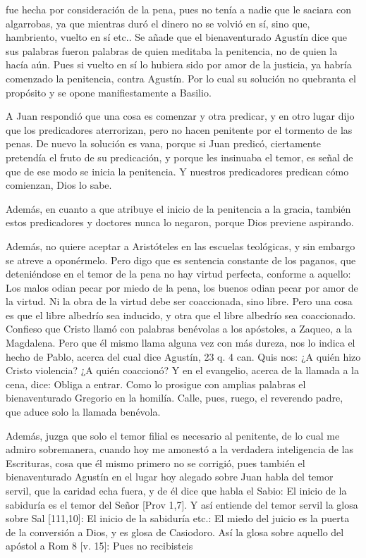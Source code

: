 fue hecha por consideración de la pena, pues no tenía a nadie que le saciara con algarrobas, ya que mientras duró el dinero no se volvió en sí, sino que, hambriento, vuelto en sí etc.. Se añade que el bienaventurado Agustín dice que sus palabras fueron palabras de quien meditaba la penitencia, no de quien la hacía aún. Pues si vuelto en sí lo hubiera sido por amor de la justicia, ya habría comenzado la penitencia, contra Agustín. Por lo cual su solución no quebranta el propósito y se opone manifiestamente a Basilio.

A Juan respondió que una cosa es comenzar y otra predicar, y en otro lugar dijo que los predicadores aterrorizan, pero no hacen penitente por el tormento de las penas. De nuevo la solución es vana, porque si Juan predicó, ciertamente pretendía el fruto de su predicación, y porque les insinuaba el temor, es señal de que de ese modo se inicia la penitencia. Y nuestros predicadores predican cómo comienzan, Dios lo sabe.

Además, en cuanto a que atribuye el inicio de la penitencia a la gracia, también estos predicadores y doctores nunca lo negaron, porque Dios previene aspirando.

Además, no quiere aceptar a Aristóteles en las escuelas teológicas, y sin embargo se atreve a oponérmelo. Pero digo que es sentencia constante de los paganos, \marginpar{\small[366]} que deteniéndose en el temor de la pena no hay virtud perfecta, conforme a aquello: Los malos odian pecar por miedo de la pena, los buenos odian pecar por amor de la virtud. Ni la obra de la virtud debe ser coaccionada, sino libre. Pero una cosa es que el libre albedrío sea inducido, y otra que el libre albedrío sea coaccionado. Confieso que Cristo llamó con palabras benévolas a los apóstoles, a Zaqueo, a la Magdalena. Pero que él mismo llama alguna vez con más dureza, nos lo indica el hecho de Pablo, acerca del cual dice Agustín, 23 q. 4 can. Quis nos: ¿A quién hizo Cristo violencia? ¿A quién coaccionó? Y en el evangelio, acerca de la llamada a la cena, dice: Obliga a entrar. Como lo prosigue con amplias palabras el bienaventurado Gregorio en la homilía. Calle, pues, ruego, el reverendo padre, que aduce solo la llamada benévola.

Además, juzga que solo el temor filial es necesario al penitente, de lo cual me admiro sobremanera, cuando hoy me amonestó a la verdadera inteligencia de las Escrituras, cosa que él mismo primero no se corrigió, pues también el bienaventurado Agustín en el lugar hoy alegado sobre Juan habla del temor servil, que la caridad echa fuera, y de él dice que habla el Sabio: El inicio de la sabiduría es el temor del Señor [Prov 1,7]. Y así entiende del temor servil la glosa sobre Sal [111,10]: El inicio de la sabiduría etc.: El miedo del juicio es la puerta de la conversión a Dios, y es glosa de Casiodoro. Así la glosa sobre aquello del apóstol a Rom 8 [v. 15]: Pues no recibisteis

